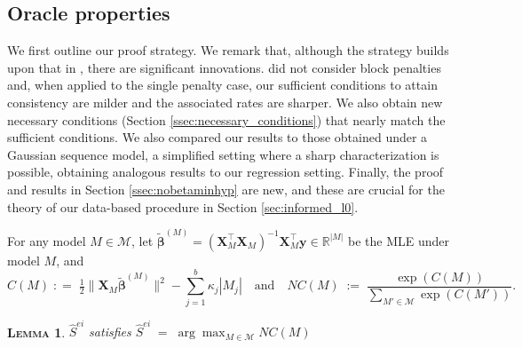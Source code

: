 \documentclass[
  12pt]{article}
\newcommand{\R}{\mathbb{R}}
\newcommand{\M}{\mathcal{M}}
\newcommand{\by}{\mathbf{y}}
\newcommand{\bbeta}{\boldsymbol{\beta}}
\newcommand{\bX}{\mathbf{X}}
\newtheorem{lem}[thm]{\textsc{Lemma}}
\begin{document}
\subsection{Oracle properties}\label{ssec:oracleprop}

We first outline our proof strategy. 
We remark that, although the strategy builds upon that in \cite{rossell2022concentration}, there are significant innovations. \color{green}\cite{rossell2022concentration} did not consider block penalties and, when applied to the single penalty case, \color{black} our sufficient conditions to attain consistency are milder and the associated rates are sharper. We also obtain new necessary conditions (Section \ref{ssec:necessary_conditions}) that nearly match the sufficient conditions. 
We also compared our results to those obtained under a Gaussian sequence model, a simplified setting where a sharp characterization is possible, obtaining analogous results to our regression setting. Finally, the proof and results in Section \ref{ssec:nobetaminhyp} are new, and these are crucial for the theory of our data-based procedure in Section \ref{sec:informed_l0}.

For any model $M\in \M$, let $\tilde{\bbeta}^{(M)}= (\bX_{\!\!M}^\top \bX_{\!\!M})^{-1}\bX_{\!\!M}^\top\by \in \R^{|M|}$ be the MLE under model $M$, and 
\begin{equation}\label{eq:CM}
    C(M)\;: =\;\tfrac{1}{2}\|\bX_M\tilde{\bbeta}^{(M)}\|^2-\sum_{j=1}^b\kappa_j |M_j|\quad\text{and}\quad NC(M)\;:=\;\frac{\exp(C(M))}{\underset{M' \in \M}{\sum} \exp(C(M'))}.
\end{equation}
\begin{lem}\label{lem:usefulreformulation} 
$\hat{S}^{ei}$ satisfies $\hat{S}^{ei}\;=\;\arg\max_{M\in \M} NC(M)$ 
\end{lem}
\end{document}

